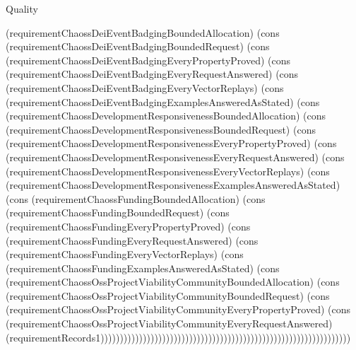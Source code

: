 \begin{lexlean}{Quality}
\begin{semanticmodule}
{(requirementChaossDeiEventBadgingBoundedAllocation) (cons (requirementChaossDeiEventBadgingBoundedRequest) (cons (requirementChaossDeiEventBadgingEveryPropertyProved) (cons (requirementChaossDeiEventBadgingEveryRequestAnswered) (cons (requirementChaossDeiEventBadgingEveryVectorReplays) (cons (requirementChaossDeiEventBadgingExamplesAnsweredAsStated) (cons (requirementChaossDevelopmentResponsivenessBoundedAllocation) (cons (requirementChaossDevelopmentResponsivenessBoundedRequest) (cons (requirementChaossDevelopmentResponsivenessEveryPropertyProved) (cons (requirementChaossDevelopmentResponsivenessEveryRequestAnswered) (cons (requirementChaossDevelopmentResponsivenessEveryVectorReplays) (cons (requirementChaossDevelopmentResponsivenessExamplesAnsweredAsStated) (cons (requirementChaossFundingBoundedAllocation) (cons (requirementChaossFundingBoundedRequest) (cons (requirementChaossFundingEveryPropertyProved) (cons (requirementChaossFundingEveryRequestAnswered) (cons (requirementChaossFundingEveryVectorReplays) (cons (requirementChaossFundingExamplesAnsweredAsStated) (cons (requirementChaossOssProjectViabilityCommunityBoundedAllocation) (cons (requirementChaossOssProjectViabilityCommunityBoundedRequest) (cons (requirementChaossOssProjectViabilityCommunityEveryPropertyProved) (cons (requirementChaossOssProjectViabilityCommunityEveryRequestAnswered) (requirementRecords1)))))))))))))))))))))))))))))))))))))))))))))))))))))))))))))))))
}


\end{semanticmodule}
\end{lexlean}
